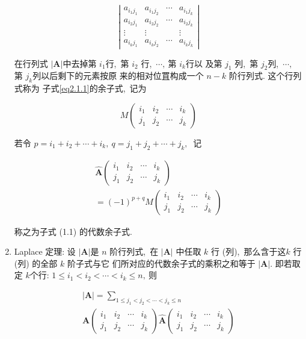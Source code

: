 \begin{enumerate}
		$$\left|\begin{array}{cccc}
			a_{i_{1} j_{1}} & a_{i_{1} j_{2}} & \cdots & a_{i_{1} j_{k}} \\
			a_{i_{2} j_{1}} & a_{i_{2} j_{2}} & \cdots & a_{i_{2} j_{k}} \\
			\vdots & \vdots & & \vdots \\
			a_{i_{k} j_{1}} & a_{i_{k} j_{2}} & \cdots & a_{i_{k} j_{k}}
		\end{array}\right|$$
		
		在行列式  $|\boldsymbol{A}|  $中去掉第  $i_{1}  $行,\  第  $i_{2} $ 行,\   $\cdots ,\  $第 $ i_{k}  $行以 及第  $j_{1} $ 列,\ 第  $j_{2}  $列,\   $\cdots ,\ $ 第 $ j_{k}  $列以后剩下的元素按原 来的相对位罝构成一个 $ n-k $ 阶行列式. 这个行列式称为 子式\eqref{eq2.1.1}的余子式,\  记为
		
		$$	M\left(\begin{array}{cccc}
			i_{1} & i_{2} & \cdots & i_{k} \\
			j_{1} & j_{2} & \cdots & j_{k}
		\end{array}\right)$$
		
		若令 $ p=i_{1}+i_{2}+\cdots+i_{k},\  q=j_{1}+j_{2}+\cdots+j_{k} ,\ $ 记
		
		$$	\begin{array}{r}
			\widehat{\boldsymbol{A}}\left(\begin{array}{cccc}
				i_{1} & i_{2} & \cdots & i_{k} \\
				j_{1} & j_{2} & \cdots & j_{k}
			\end{array}\right) \\
			=(-1)^{p+q} M\left(\begin{array}{cccc}
				i_{1} & i_{2} & \cdots & i_{k} \\
				j_{1} & j_{2} & \cdots & j_{k}
			\end{array}\right)
		\end{array}$$
		
		称之为子式 (1.1) 的代数余子式.
		
		\item Laplace 定理: 设 $ |\boldsymbol{A}|  $是 $ n$  阶行列式,\  在  $|\boldsymbol{A}| $ 中任取 $ k $ 行 (列),\ 那么含于这$  k $ 行 (列) 的全部 $ k$  阶子式与它 们所对应的代数余子式的乘积之和等于  $|\boldsymbol{A}| .$ 即若取定 $ k  $个行: $ 1 \leqslant i_{1}<i_{2}<\cdots<i_{k} \leqslant n ,\  $则
		
		$$	\begin{array}{c}
			|\boldsymbol{A}|=\sum\limits_{1 \leqslant j_{1}<j_{2}<\cdots<j_{k} \leqslant n} \\
			\boldsymbol{A}\left(\begin{array}{cccc}
				i_{1} & i_{2} & \cdots & i_{k} \\
				j_{1} & j_{2} & \cdots & j_{k}
			\end{array}\right) \widehat{\boldsymbol{A}}\left(\begin{array}{cccc}
				i_{1} & i_{2} & \cdots & i_{k} \\
				j_{1} & j_{2} & \cdots & j_{k}
			\end{array}\right)
		\end{array}$$
		

\end{enumerate}
